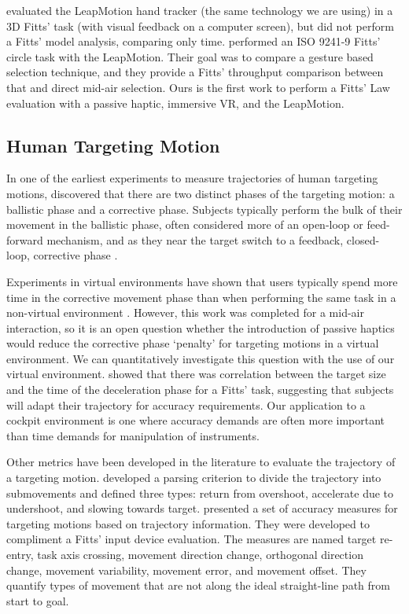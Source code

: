 \citet{coelho_pointing_2014} evaluated the LeapMotion hand tracker (the same technology we are using) in a 3D Fitts' task (with visual feedback on a computer screen), but did not perform a Fitts' model analysis, comparing only time.
\citet{seixas_one_2015} performed an ISO 9241-9 Fitts' circle task with the LeapMotion.
Their goal was to compare a gesture based selection technique, and they provide a Fitts' throughput comparison between that and direct mid-air selection.
Ours is the first work to perform a Fitts' Law evaluation with a passive haptic, immersive VR, and the LeapMotion.

\subsection{Human Targeting Motion}
\label{human-targeting-motion}

In one of the earliest experiments to measure trajectories of human targeting motions, \citet{woodworth_accuracy_1899} discovered that there are two distinct phases of the targeting motion: a ballistic phase and a corrective phase.
Subjects typically perform the bulk of their movement in the ballistic phase, often considered more of an open-loop or feed-forward mechanism, and as they near the target switch to a feedback, closed-loop, corrective phase \citep{elliott_control_1999}.

Experiments in virtual environments have shown that users typically spend more time in the corrective movement phase than when performing the same task in a non-virtual environment \citep{liu_comparing_2009}.
However, this work was completed for a mid-air interaction, so it is an open question whether the introduction of passive haptics would reduce the corrective phase `penalty' for targeting motions in a virtual environment.
We can quantitatively investigate this question with the use of our virtual environment.
\citet{mackenzie_three-dimensional_1987} showed that there was correlation between the target size and the time of the deceleration phase for a Fitts' task, suggesting that subjects will adapt their trajectory for accuracy requirements.
Our application to a cockpit environment is one where accuracy demands are often more important than time demands for manipulation of instruments.

Other metrics have been developed in the literature to evaluate the trajectory of a targeting motion.
\citet{meyer_optimality_1988} developed a parsing criterion to divide the trajectory into submovements and defined three types: return from overshoot, accelerate due to undershoot, and slowing towards target.
\citet{mackenzie_accuracy_2001} presented a set of accuracy measures for targeting motions based on trajectory information.
They were developed to compliment a Fitts' input device evaluation.
The measures are named target re-entry, task axis crossing, movement direction change, orthogonal direction change, movement variability, movement error, and movement offset.
They quantify types of movement that are not along the ideal straight-line path from start to goal.

